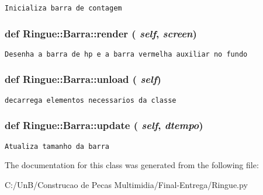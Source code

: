 \begin{footnotesize}\begin{verbatim}Inicializa barra de contagem \end{verbatim}
\end{footnotesize}
 \hypertarget{class_ringue_1_1_barra_13ff8636af3bd3e5b3e3b2d034634bcb}{
\subsubsection[{render}]{\setlength{\rightskip}{0pt plus 5cm}def Ringue::Barra::render ( {\em self}, \/   {\em screen})}}
\label{class_ringue_1_1_barra_13ff8636af3bd3e5b3e3b2d034634bcb}




\begin{footnotesize}\begin{verbatim}Desenha a barra de hp e a barra vermelha auxiliar no fundo \end{verbatim}
\end{footnotesize}
 \hypertarget{class_ringue_1_1_barra_c39e835b9e2c4a4fa10d6126e444dbf7}{
\subsubsection[{unload}]{\setlength{\rightskip}{0pt plus 5cm}def Ringue::Barra::unload ( {\em self})}}
\label{class_ringue_1_1_barra_c39e835b9e2c4a4fa10d6126e444dbf7}




\begin{footnotesize}\begin{verbatim}decarrega elementos necessarios da classe \end{verbatim}
\end{footnotesize}
 \hypertarget{class_ringue_1_1_barra_a08aa7c124a22fc2a3b32736751d0e6d}{
\subsubsection[{update}]{\setlength{\rightskip}{0pt plus 5cm}def Ringue::Barra::update ( {\em self}, \/   {\em dtempo})}}
\label{class_ringue_1_1_barra_a08aa7c124a22fc2a3b32736751d0e6d}




\begin{footnotesize}\begin{verbatim}Atualiza tamanho da barra \end{verbatim}
\end{footnotesize}
 

The documentation for this class was generated from the following file:\begin{CompactItemize}
\item 
C:/UnB/Construcao de Pecas Multimidia/Final-Entrega/Ringue.py\end{CompactItemize}
